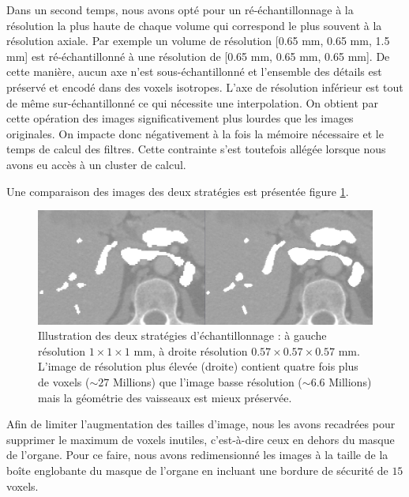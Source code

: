 Dans un second temps, nous avons opté pour un ré-échantillonnage à la résolution la plus haute de chaque volume qui correspond le plus souvent à la résolution axiale. Par exemple un volume de résolution [0.65 mm, 0.65 mm, 1.5 mm] est ré-échantillonné à une résolution de [0.65 mm, 0.65 mm, 0.65 mm]. De cette manière, aucun axe n'est sous-échantillonné et l'ensemble des détails est préservé et encodé dans des voxels isotropes. L'axe de résolution inférieur est tout de même sur-échantillonné ce qui nécessite une interpolation. On obtient par cette opération des images significativement plus lourdes que les images originales. On impacte donc négativement à la fois la mémoire nécessaire et le temps de calcul des filtres. Cette contrainte s'est toutefois allégée lorsque nous avons eu accès à un cluster de calcul.

Une comparaison des images des deux stratégies est présentée figure \ref{fig:resolution_comparison}.

\begin{figure}[!ht]
  \centering
  \includegraphics[width=\textwidth]{Images/resolution_111_xxx.png}
  \caption{Illustration des deux stratégies d'échantillonnage : à gauche résolution $1\times1\times1$ mm, à droite résolution $0.57\times0.57\times0.57$ mm. L'image de résolution plus élevée (droite) contient quatre fois plus de voxels ($\sim 27$ Millions) que l'image basse résolution ($\sim 6.6$ Millions) mais la géométrie des vaisseaux est mieux préservée.}
  \label{fig:resolution_comparison}
\end{figure}

Afin de limiter l'augmentation des tailles d'image, nous les avons recadrées pour supprimer le maximum de voxels inutiles, c'est-à-dire ceux en dehors du masque de l'organe. Pour ce faire, nous avons redimensionné les images à la taille de la boîte englobante du masque de l'organe en incluant une bordure de sécurité de $15$ voxels. 

